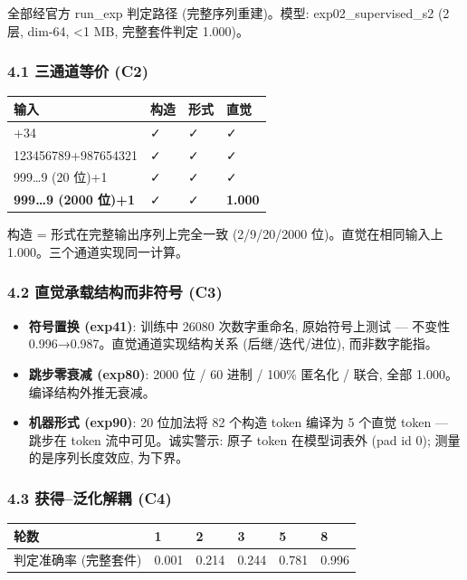 \documentclass[
]{article}
\providecommand{\tightlist}{%
  \setlength{\itemsep}{0pt}\setlength{\parskip}{0pt}}
\begin{document}
全部经官方 run\_exp 判定路径 (完整序列重建)。模型: exp02\_supervised\_s2
(2 层, dim-64, \textless1 MB, 完整套件判定 1.000)。

\subsubsection{4.1 三通道等价
(C2)}\label{ux4e09ux901aux9053ux7b49ux4ef7-c2}

\begin{longtable}[]{@{}llll@{}}
\toprule\noalign{}
输入 & 构造 & 形式 & 直觉 \\
\midrule\noalign{}
\endhead
\bottomrule\noalign{}
\endlastfoot
12+34 & ✓ & ✓ & ✓ \\
123456789+987654321 & ✓ & ✓ & ✓ \\
999\ldots9 (20 位)+1 & ✓ & ✓ & ✓ \\
\textbf{999\ldots9 (2000 位)+1} & ✓ & ✓ & \textbf{1.000} \\
\end{longtable}

构造 = 形式在完整输出序列上完全一致 (2/9/20/2000 位)。直觉在相同输入上
1.000。三个通道实现同一计算。

\subsubsection{4.2 直觉承载结构而非符号
(C3)}\label{ux76f4ux89c9ux627fux8f7dux7ed3ux6784ux800cux975eux7b26ux53f7-c3}

\begin{itemize}
\tightlist
\item
  \textbf{符号置换 (exp41)}: 训练中 26080 次数字重命名, 原始符号上测试
  --- 不变性 0.996→0.987。直觉通道实现结构关系 (后继/迭代/进位),
  而非数字能指。
\item
  \textbf{跳步零衰减 (exp80)}: 2000 位 / 60 进制 / 100\% 匿名化 / 联合,
  全部 1.000。编译结构外推无衰减。
\item
  \textbf{机器形式 (exp90)}: 20 位加法将 82 个构造 token 编译为 5 个直觉
  token --- 跳步在 token 流中可见。诚实警示: 原子 token 在模型词表外
  (pad id 0); 测量的是序列长度效应, 为下界。
\end{itemize}

\subsubsection{4.3 获得--泛化解耦
(C4)}\label{ux83b7ux5f97ux6cdbux5316ux89e3ux8026-c4}

\begin{longtable}[]{@{}llllll@{}}
\toprule\noalign{}
轮数 & 1 & 2 & 3 & 5 & 8 \\
\midrule\noalign{}
\endhead
\bottomrule\noalign{}
\endlastfoot
判定准确率 (完整套件) & 0.001 & 0.214 & 0.244 & 0.781 & 0.996 \\
\end{longtable}
\end{document}
